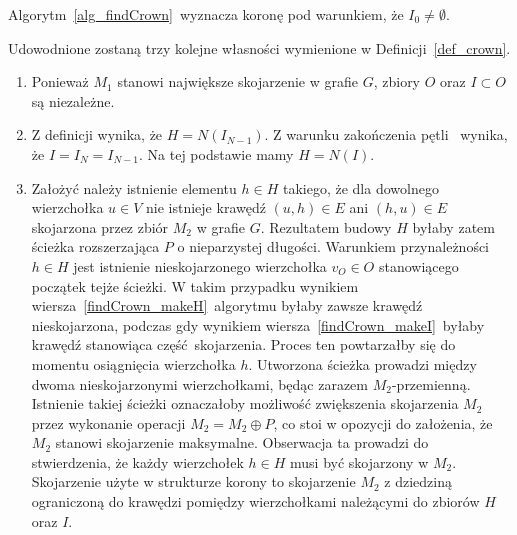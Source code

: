 \begin{theorem}
  Algorytm~\ref{alg_findCrown}\ wyznacza koronę pod warunkiem, że $I_0\neq\emptyset$.
\end{theorem}
\begin{bproof} Udowodnione zostaną trzy kolejne własności wymienione w Definicji~\ref{def_crown}.
  \begin{enumerate}
    \item Ponieważ $M_1$ stanowi największe skojarzenie w grafie $G$, zbiory $O$ oraz $I \subset O$ są niezależne.
    \item  Z definicji wynika, że $H=N(I_{N-1})$.
      Z warunku zakończenia pętli~ wynika, że $I=I_N=I_{N-1}$.
      Na tej podstawie mamy $H=N(I)$.
    \item Założyć należy istnienie elementu $h \in H$ takiego, że dla dowolnego wierzchołka $u \in V$ nie istnieje krawędź $(u, h) \in E$ ani $(h, u) \in E$ skojarzona przez zbiór $M_2$ w grafie $G$.
    Rezultatem budowy $H$ byłaby zatem ścieżka rozszerzająca $P$ o nieparzystej długości. 
    Warunkiem przynależności $h \in H$ jest istnienie nieskojarzonego wierzchołka $v_O \in O$ stanowiącego początek tejże ścieżki.
    W takim przypadku wynikiem wiersza~\ref{findCrown_makeH}\ algorytmu byłaby zawsze krawędź nieskojarzona, podczas gdy wynikiem wiersza~\ref{findCrown_makeI}\ byłaby krawędź stanowiąca część~skojarzenia.
    Proces ten powtarzałby się do momentu osiągnięcia wierzchołka $h$.
    Utworzona ścieżka prowadzi między dwoma nieskojarzonymi wierzchołkami, będąc zarazem $M_2$-przemienną.
    Istnienie takiej ścieżki oznaczałoby możliwość zwiększenia skojarzenia $M_2$ przez wykonanie operacji $M_2=M_2\oplus P$, co stoi w opozycji do założenia, że $M_2$ stanowi skojarzenie maksymalne.
    Obserwacja ta prowadzi do stwierdzenia, że każdy wierzchołek $h \in H$ musi być skojarzony w $M_2$.
    Skojarzenie użyte w strukturze korony to skojarzenie $M_2$ z dziedziną ograniczoną do krawędzi pomiędzy wierzchołkami należącymi do zbiorów $H$ oraz $I$.
  \end{enumerate}
\end{bproof}

